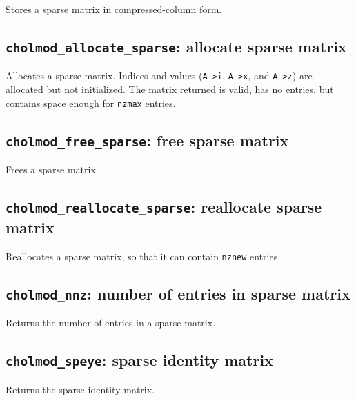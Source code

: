 \documentclass[11pt]{article}
\begin{document}

Stores a sparse matrix in compressed-column form.

\subsection{{\tt cholmod\_allocate\_sparse}: allocate sparse matrix}


Allocates a sparse matrix.  Indices and values ({\tt A->i}, {\tt A->x}, and
{\tt A->z}) are allocated but not initialized.  The matrix returned is valid,
has no entries, but contains space enough for {\tt nzmax} entries.

\subsection{{\tt cholmod\_free\_sparse}: free sparse matrix}


Frees a sparse matrix.

\subsection{{\tt cholmod\_reallocate\_sparse}: reallocate sparse matrix}


Reallocates a sparse matrix, so that it can contain {\tt nznew} entries.

\subsection{{\tt cholmod\_nnz}: number of entries in sparse matrix}


Returns the number of entries in a sparse matrix.

\subsection{{\tt cholmod\_speye}: sparse identity matrix}


Returns the sparse identity matrix.

\end{document}

